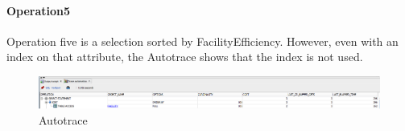 \paragraph{Operation5} \leavevmode \newline

Operation five is a selection sorted by FacilityEfficiency. However, even with an index on that attribute, the Autotrace shows that the index is not used.

\begin{figure}[H]
    \centering
    \includegraphics[width=\textwidth]{images/EffScore.png}
    \caption{Autotrace}
\end{figure}